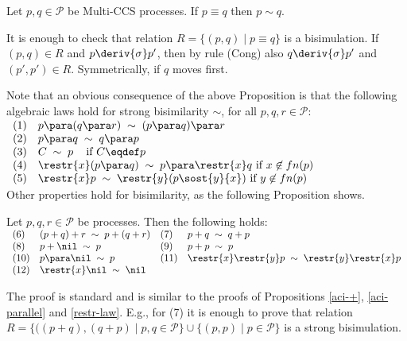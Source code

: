 \begin{proposition}\label{prop1}
Let $p, q \in {\mathcal P}$ be Multi-CCS processes. If $p \equiv q$ then $p \sim q$.

\proof
It is enough to check that relation $R = \{(p, q) \mid p \equiv q\}$ is a bisimulation.
If $(p, q) \in R$ and $p \deriv{\sigma} p'$, then by rule (Cong)
also $q \deriv{\sigma} p'$ and $(p', p') \in R$. Symmetrically, if $q$ moves first.
\fine
\end{proposition}

Note that an obvious consequence of the above Proposition is that the following 
algebraic laws hold for strong bisimilarity $\sim$, for all $p, q, r \in {\mathcal P}$:\\

$\begin{array}{llll}
(1) & p \para (q \para r) \; \sim \; (p \para q) \para r \\
(2) & p \para q\; \sim \; q \para p \\
(3) & C \; \sim \; p \; \; \; \mbox{ if $C \eqdef p$ }\\
(4) & \restr{x}(p \para q) \; \sim \;  p \para \restr{x}q \mbox{  if } x \not\in fn(p) \\
(5) & \restr{x}p \; \sim \;  \restr{y} (p\sost{y}{x}) \mbox{  if } y \not\in fn(p) \\
\end{array}$\\

Other properties hold for bisimilarity, as the following Proposition shows.

\begin{proposition}\label{prop2}
Let $p, q, r \in {\mathcal P}$ be processes. Then the following holds:\\

$\begin{array}{llll}
(6) & (p + q) + r \; \sim \; p + (q +r)  &
(7) & p + q\; \sim \; q + p  \\
(8) & p + \nil \; \sim \;  p  &
(9) & p + p \; \sim \; p \\
(10) & p \para \nil \; \sim \;  p &
(11) & \restr{x}\restr{y}p \; \sim \;  \restr{y}\restr{x}p\\
(12) & \restr{x} \nil \; \sim \; \nil &
\end{array}$

\proof 
The proof is standard and is similar to the proofs of Propositions \ref{aci-+}, \ref{aci-parallel} and \ref{restr-law}.
E.g., for (7) it is enough to prove that relation $R = \{ ((p+q),(q+p) \mid p,q \in   {\mathcal P} \} \cup 
\{ (p,p) \mid p \in  {\mathcal P} \} $ is a strong bisimulation. 
\fine
\end{proposition}

